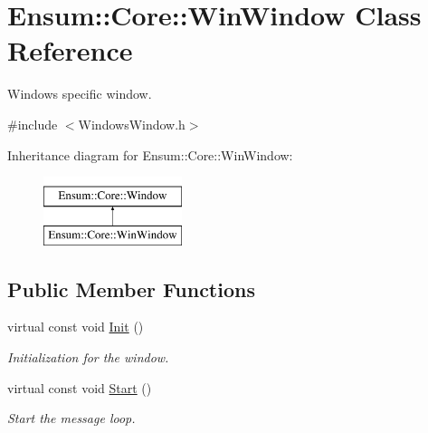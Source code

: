 \hypertarget{class_ensum_1_1_core_1_1_win_window}{}\section{Ensum\+:\+:Core\+:\+:Win\+Window Class Reference}
\label{class_ensum_1_1_core_1_1_win_window}


Windows specific window.  




{\ttfamily \#include $<$Windows\+Window.\+h$>$}

Inheritance diagram for Ensum\+:\+:Core\+:\+:Win\+Window\+:\begin{figure}[H]
\begin{center}
\leavevmode
\includegraphics[height=2.000000cm]{class_ensum_1_1_core_1_1_win_window}
\end{center}
\end{figure}
\subsection*{Public Member Functions}
\begin{DoxyCompactItemize}
\item 
virtual const void \hyperlink{class_ensum_1_1_core_1_1_win_window_afb59ce364f98918b2b17653cbfc39ead}{Init} ()\hypertarget{class_ensum_1_1_core_1_1_win_window_afb59ce364f98918b2b17653cbfc39ead}{}\label{class_ensum_1_1_core_1_1_win_window_afb59ce364f98918b2b17653cbfc39ead}

\begin{DoxyCompactList}\small\item\em Initialization for the window. \end{DoxyCompactList}\item 
virtual const void \hyperlink{class_ensum_1_1_core_1_1_win_window_a1c316902d186c3d685210237e3438745}{Start} ()\hypertarget{class_ensum_1_1_core_1_1_win_window_a1c316902d186c3d685210237e3438745}{}\label{class_ensum_1_1_core_1_1_win_window_a1c316902d186c3d685210237e3438745}

\begin{DoxyCompactList}\small\item\em Start the message loop. \end{DoxyCompactList}\end{DoxyCompactItemize}
